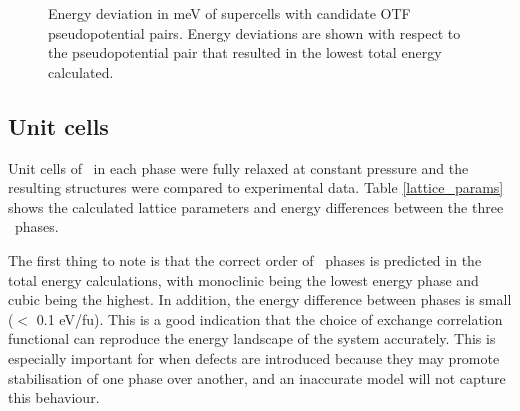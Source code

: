 \begin{figure}[ht]
  \begin{center}
    \caption{Energy deviation in meV of supercells with candidate OTF pseudopotential pairs. Energy deviations are shown with respect to the pseudopotential pair that resulted in the lowest total energy calculated.}
    \label{Figure:otf_pp_test}
  \end{center}
\end{figure}

\subsection{Unit cells}

Unit cells of \zirconia\ in each phase were fully relaxed at constant pressure and the resulting structures were compared to experimental data. Table \ref{lattice_params} shows the calculated lattice parameters and energy differences between the three \zirconia\ phases. 

The first thing to note is that the correct order of \zirconia\ phases is predicted in the total energy calculations, with monoclinic being the lowest energy phase and cubic being the highest. In addition, the energy difference between phases is small ($<$ 0.1 eV/fu). This is a good indication that the choice of exchange correlation functional can reproduce the energy landscape of the system accurately. This is especially important for when defects are introduced because they may promote stabilisation of one phase over another, and an inaccurate model will not capture this behaviour.



